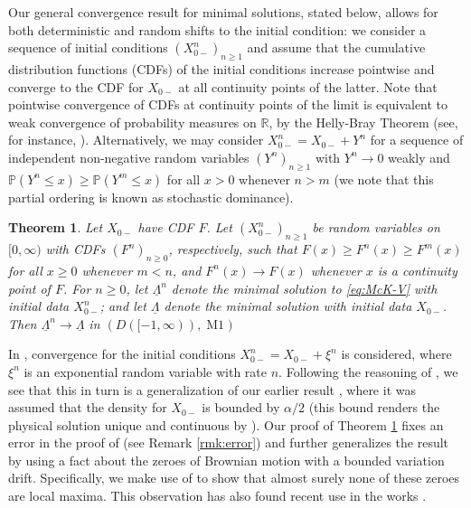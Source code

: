 \documentclass[12pt]{amsart}
\newcommand{\R}{\mathbb{R}}
\newcommand{\ubar}{\underline}
\newcommand{\bP}{\mathbb{P}}
\theoremstyle{plain}
\newtheorem{thm}{Theorem}[section]
\theoremstyle{definition}
\begin{document}
\medskip

Our general convergence result for minimal solutions, stated below, allows for both deterministic and random shifts to the initial condition: we consider a sequence of initial conditions $(X_{0-}^n)_{n\ge 1}$ and assume that the cumulative distribution functions (CDFs) of the initial conditions increase pointwise and converge to the CDF for $X_{0-}$ at all continuity points of the latter. 
Note that pointwise convergence of CDFs at continuity points of the limit is equivalent to weak convergence of probability measures on $\R$, by the Helly-Bray Theorem (see, for instance, \cite[Theorem 11.1.2]{dudley_real_2002}). Alternatively, we may consider $X_{0-}^n=X_{0-}+Y^n$ for a sequence of independent non-negative random variables $(Y^n)_{n\ge 1}$ with $Y^n\to0$ weakly and $\bP(Y^n\le x)\ge \bP(Y^m\le x)$ for all $x>0$ whenever $n>m$ (we note that this partial ordering is known as stochastic dominance).

\begin{thm}
\label{thm:rc}
Let $X_{0-}$ have CDF $F$. Let $(X_{0-}^n)_{n\ge 1}$ be random variables on $[0,\infty)$ with CDFs $(F^n)_{n\ge 0}$, respectively, such that $F(x) \ge F^n(x)\ge F^m(x)$ for all $x\ge 0$ whenever $m<n$, and $F^n(x)\to F(x)$ whenever $x$ is a continuity point of $F$. For $n\ge0$, let $\ubar{\Lambda}^n$ denote the minimal solution to \eqref{eq:McK-V} with initial data $X_{0-}^n$; and let $\ubar{\Lambda}$ denote the minimal solution with initial data $X_{0-}$. Then $\ubar{\Lambda}^n\to \ubar{\Lambda}$ in $(D([-1,\infty)),\operatorname{M1})$
\end{thm}

In \cite[Proposition 5.1]{hambly_mckean-vlasov_2022}, convergence for the initial conditions $X_{0-}^n=X_{0-}+\xi^n$ is considered, where $\xi^n$ is an exponential random variable with rate $n$. Following the reasoning of \cite[Section 3]{hambly_mckean-vlasov_2022}, we see that this in turn is a generalization of our earlier result \cite[Theorem 1.2]{baker_zero_2022}, where it was assumed that the density for $X_{0-}$ is bounded by $\alpha/2$ 
(this bound renders the physical solution unique and continuous by \cite[Theorem 2.2 and last paragraph of Section 2.1]{ledger_uniqueness_2020}).
Our proof of Theorem \ref{thm:rc} fixes an error in the proof of \cite[Proposition 5.1]{hambly_mckean-vlasov_2022} (see Remark \ref{rmk:error}) and further generalizes the result by using a fact about the zeroes of Brownian motion with a bounded variation drift. Specifically, we make use of \cite[proof of Proposition 3.4(i)]{antunovic_isolated_2011} to show that almost surely none of these zeroes are local maxima. This observation has also found recent use in the works \cite{baker_singular_2023,nadtochiy_stefan_2022}.
\end{document}
